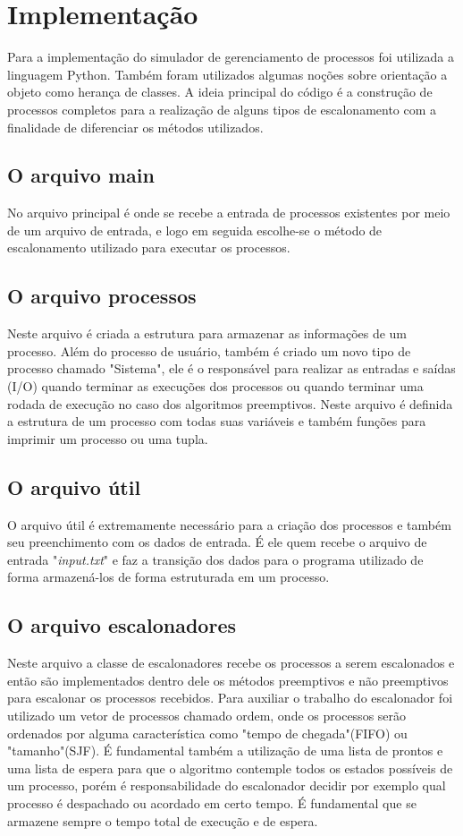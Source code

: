 \documentclass[times, 10pt,twocolumn]{article}
\begin{document}
\section{Implementação} 
Para a implementação do simulador de gerenciamento de processos foi utilizada a linguagem Python. Também foram utilizados algumas noções sobre orientação a objeto como herança de classes. A ideia principal do código é a construção de processos completos para a realização de alguns tipos de escalonamento com a finalidade de diferenciar os métodos utilizados.   
\subsection{O arquivo main}
No arquivo principal é onde se recebe a entrada de processos existentes por meio de um arquivo de entrada, e logo em seguida escolhe-se o método de escalonamento utilizado para executar os processos.   
\subsection{O arquivo processos} 
Neste arquivo é criada a estrutura para armazenar as informações de um processo. Além do processo de usuário, também é criado um novo tipo de processo chamado "Sistema", ele é o responsável para realizar as entradas e saídas (I/O) quando terminar as execuções dos processos ou quando terminar uma rodada de execução no caso dos algoritmos preemptivos. Neste arquivo é definida a estrutura de um processo com todas suas variáveis e também funções para imprimir um processo ou uma tupla.
\subsection{O arquivo útil}  
O arquivo útil é extremamente necessário para a criação dos processos e  também seu preenchimento com os dados de entrada. É ele quem recebe o arquivo de entrada "\textit{input.txt}" e faz a transição dos dados para o programa utilizado de forma armazená-los de forma estruturada em um processo.
\subsection{O arquivo escalonadores} 
Neste arquivo a classe de escalonadores recebe os processos a serem escalonados e então são implementados dentro dele os métodos preemptivos e não preemptivos para escalonar os processos recebidos. Para auxiliar o trabalho do escalonador foi utilizado um vetor de processos chamado ordem, onde os processos serão ordenados por alguma característica como "tempo de chegada"(FIFO) ou "tamanho"(SJF). É fundamental também a utilização de uma lista de prontos e uma lista de espera para que o algoritmo contemple todos os estados possíveis de um processo, porém é responsabilidade do escalonador decidir por exemplo qual processo é despachado ou acordado em certo tempo. É fundamental que se armazene sempre o tempo total de execução e de espera.
\end{document}
